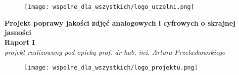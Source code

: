 \documentclass[]{mwart}
\begin{document}
\part{}
\thispagestyle{empty}

\begin{figure}[h]
    \centering
    \texttt{[image: wspolne\_dla\_wszystkich/logo\_uczelni.png]}
\end{figure}


\begin{center}
    {\LARGE \textbf{Projekt poprawy jakości zdjęć analogowych i cyfrowych o skrajnej jasności}} \\[0.3cm]
    {\large \textbf{Raport I}} \\[0.2cm]
    \textit{projekt realizowany pod opieką prof. dr hab. inż. Artura Przelaskowskiego}

\end{center}

\begin{figure}[h]
    \centering
    \texttt{[image: wspolne\_dla\_wszystkich/logo\_projektu.png]}
\end{figure}

\vfill
\begin{abstract}
    Raport 1 projektu poprawy jakości zdjęć wykonanych analogowych przez grupę wtorkową z godziny 18
    w składzie:  Bartosz Wójcik, Katarzyna Szwed, Natalia Szymańska,
    Patrycja Szałajko, Aleksandra Wójcik, Karol Sęk, Michał Juszkiewicz, Filip Sajko.

    W tym raporcie skupimy się na opisie procesu wyboru tematu projektu, jego definiowaniu
    i planach jego analizy i rozwiązania. Ponadto wykonamy zdjęcia i zaczniemy je analizować.
\end{abstract}



\newpage
\end{document}
